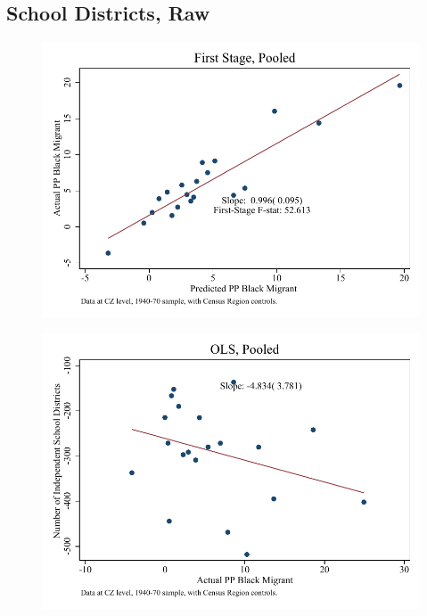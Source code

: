 \documentclass{article}
\begin{document}
\subsection{School Districts, Raw}

\clearpage
\begin{figure}
\centering
\includegraphics{figures/simplefigs/pooled_schdist_ind_raw_C3_fs.pdf}
\end{figure}
\clearpage
\begin{figure}
\centering
\includegraphics{figures/simplefigs/pooled_schdist_ind_raw_C3_ols.pdf}
\end{figure}
\clearpage
\end{document}
